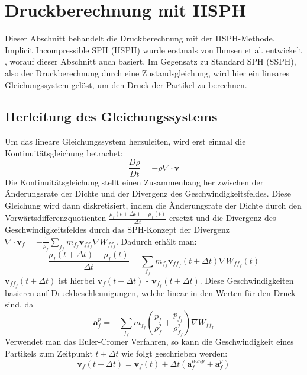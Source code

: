 \documentclass[11pt,
a4paper,
parskip=half, %
BCOR=10mm, %
english,
ngerman]{scrreprt}
\begin{document}
\section{Druckberechnung mit IISPH}
Dieser Abschnitt behandelt die Druckberechnung mit der IISPH-Methode.
Implicit Incompressible SPH (IISPH) wurde erstmals von Ihmsen et al. entwickelt \cite{ihmsen_implicit_2014}, worauf dieser Abschnitt auch basiert.
Im Gegensatz zu Standard SPH (SSPH), also der Druckberechnung durch eine Zustandsgleichung, wird hier ein lineares Gleichungssystem gelöst,
um den Druck der Partikel zu berechnen.


\subsection{Herleitung des Gleichungssystems}
Um das lineare Gleichungssystem herzuleiten, wird erst einmal die Kontinuitätsgleichung betrachet:
\begin{equation}
    \frac{D\rho}{Dt} = -\rho \nabla \cdot \textbf{v}
\end{equation}
Die Kontinuitätsgleichung stellt einen Zusammenhang her zwischen der Änderungsrate der Dichte und der Divergenz des Geschwindigkeitsfeldes.
Diese Gleichung wird dann diskretisiert,
indem die Änderungsrate der Dichte durch den Vorwärtsdifferenzquotienten $\frac{\rho_f(t+\Delta t) - \rho_f(t)}{\Delta t}$ ersetzt und 
die Divergenz des Geschwindigkeitsfeldes durch
das SPH-Konzept der Divergenz $\nabla \cdot \textbf{v}_f = -\frac{1}{\rho_f} \sum_{f_f} m_{f_f} \textbf{v}_{ff_f} \nabla W_{ff_f}$.
Dadurch erhält man:
\begin{equation}
    \label{equation:continuity_discretization}
    \frac{\rho_f(t+\Delta t) - \rho_f(t)}{\Delta t} = \sum_{f_f} m_{f_f} \textbf{v}_{ff_f}(t+\Delta t) \nabla W_{ff_f}(t)
\end{equation}
$\textbf{v}_{ff_f}(t+\Delta t)$ ist hierbei $\textbf{v}_{f}(t+\Delta t)$ - $\textbf{v}_{f_f}(t+\Delta t)$.
Diese Geschwindigkeiten basieren auf Druckbeschleunigungen, welche linear in den Werten für den Druck sind, da
\begin{equation}
    \label{equation:pressure_acceleration}
    \textbf{a}_f^p = -\sum_{f_f} m_{f_f} \left( \frac{p_f}{\rho_f^2} + \frac{p_{f_f}}{\rho_{f_f}^2} \right) \nabla W_{ff_f}
\end{equation}
Verwendet man das Euler-Cromer Verfahren, so kann die Geschwindigkeit eines Partikels zum Zeitpunkt $t + \Delta t$ wie folgt geschrieben werden:
\begin{equation}
    \textbf{v}_f(t + \Delta t) = \textbf{v}_f(t) + \Delta t \left(\textbf{a}_f^{nonp} + \textbf{a}_f^p\right)
\end{equation}
\end{document}
